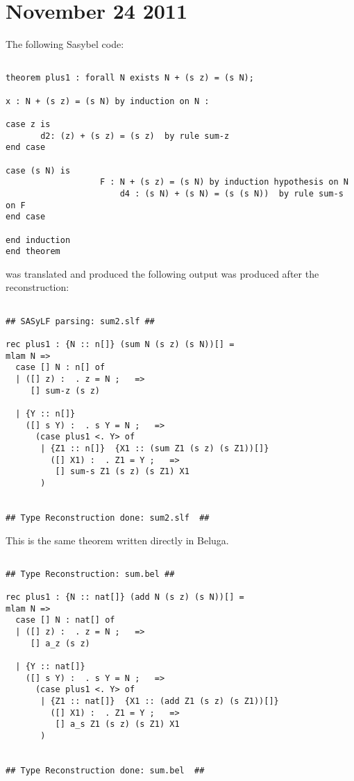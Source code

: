 \documentclass[12pt]{article}
\begin{document}
\section{November 24 2011}
The following \textmd{Sasybel} code:
\begin{verbatim}

theorem plus1 : forall N exists N + (s z) = (s N);

x : N + (s z) = (s N) by induction on N : 

case z is
	   d2: (z) + (s z) = (s z) 	by rule sum-z
end case

case (s N) is
	               F : N + (s z) = (s N) by induction hypothesis on N
                       d4 : (s N) + (s N) = (s (s N))  by rule sum-s on F
end case

end induction
end theorem 

\end{verbatim}
was translated and produced the following output was produced after the reconstruction:
\begin{verbatim}

## SASyLF parsing: sum2.slf ##

rec plus1 : {N :: n[]} (sum N (s z) (s N))[] = 
mlam N => 
  case [] N : n[] of 
  | ([] z) :  . z = N ;   => 
     [] sum-z (s z)
  
  | {Y :: n[]}
    ([] s Y) :  . s Y = N ;   => 
      (case plus1 <. Y> of 
       | {Z1 :: n[]}  {X1 :: (sum Z1 (s z) (s Z1))[]}
         ([] X1) :  . Z1 = Y ;   => 
          [] sum-s Z1 (s z) (s Z1) X1
       )
  

## Type Reconstruction done: sum2.slf  ##

\end{verbatim}
This is the same theorem written directly in \textmd{Beluga}.
\begin{verbatim}

## Type Reconstruction: sum.bel ##

rec plus1 : {N :: nat[]} (add N (s z) (s N))[] = 
mlam N => 
  case [] N : nat[] of 
  | ([] z) :  . z = N ;   => 
     [] a_z (s z)
  
  | {Y :: nat[]}
    ([] s Y) :  . s Y = N ;   => 
      (case plus1 <. Y> of 
       | {Z1 :: nat[]}  {X1 :: (add Z1 (s z) (s Z1))[]}
         ([] X1) :  . Z1 = Y ;   => 
          [] a_s Z1 (s z) (s Z1) X1
       )
  

## Type Reconstruction done: sum.bel  ##
\end{verbatim}
\end{document}
